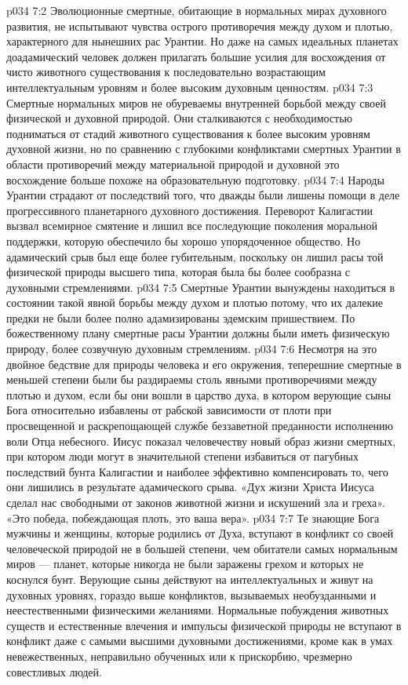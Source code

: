 \vs p034 7:2 Эволюционные смертные, обитающие в нормальных мирах духовного развития, не испытывают чувства острого противоречия между духом и плотью, характерного для нынешних рас Урантии. Но даже на самых идеальных планетах доадамический человек должен прилагать большие усилия для восхождения от чисто животного существования к последовательно возрастающим интеллектуальным уровням и более высоким духовным ценностям.
\vs p034 7:3 Смертные нормальных миров не обуреваемы внутренней борьбой между своей физической и духовной природой. Они сталкиваются с необходимостью подниматься от стадий животного существования к более высоким уровням духовной жизни, но по сравнению с глубокими конфликтами смертных Урантии в области противоречий между материальной природой и духовной это восхождение больше похоже на образовательную подготовку.
\vs p034 7:4 \pc Народы Урантии страдают от последствий того, что дважды были лишены помощи в деле прогрессивного планетарного духовного достижения. Переворот Калигастии вызвал всемирное смятение и лишил все последующие поколения моральной поддержки, которую обеспечило бы хорошо упорядоченное общество. Но адамический срыв был еще более губительным, поскольку он лишил расы той физической природы высшего типа, которая была бы более сообразна с духовными стремлениями.
\vs p034 7:5 Смертные Урантии вынуждены находиться в состоянии такой явной борьбы между духом и плотью потому, что их далекие предки не были более полно адамизированы эдемским пришествием. По божественному плану смертные расы Урантии должны были иметь физическую природу, более созвучную духовным стремлениям.
\vs p034 7:6 \pc Несмотря на это двойное бедствие для природы человека и его окружения, теперешние смертные в меньшей степени были бы раздираемы столь явными противоречиями между плотью и духом, если бы они вошли в царство духа, в котором верующие сыны Бога относительно избавлены от рабской зависимости от плоти при просвещенной и раскрепощающей службе беззаветной преданности исполнению воли Отца небесного. Иисус показал человечеству новый образ жизни смертных, при котором люди могут в значительной степени избавиться от пагубных последствий бунта Калигастии и наиболее эффективно компенсировать то, чего они лишились в результате адамического срыва. «Дух жизни Христа Иисуса сделал нас свободными от законов животной жизни и искушений зла и греха». «Это победа, побеждающая плоть, это ваша вера».
\vs p034 7:7 Те знающие Бога мужчины и женщины, которые родились от Духа, вступают в конфликт со своей человеческой природой не в большей степени, чем обитатели самых нормальным миров --- планет, которые никогда не были заражены грехом и которых не коснулся бунт. Верующие сыны действуют на интеллектуальных и живут на духовных уровнях, гораздо выше конфликтов, вызываемых необузданными и неестественными физическими желаниями. Нормальные побуждения животных существ и естественные влечения и импульсы физической природы не вступают в конфликт даже с самыми высшими духовными достижениями, кроме как в умах невежественных, неправильно обученных или к прискорбию, чрезмерно совестливых людей.
